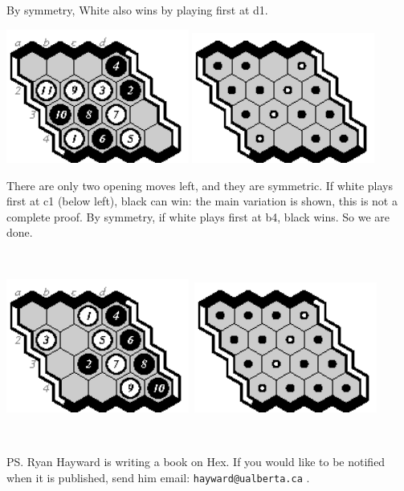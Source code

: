 \documentclass[12pt]{article}
\begin{document}
By symmetry, White also wins by playing first at d1.

\includegraphics[width=60mm]{fz/pix/4z.eps}
\includegraphics[width=60mm]{fz/pix/4x4.winners2.eps}
~

There are only two opening moves left, and they are symmetric.
If white plays first at c1 (below left), black can win:
the main variation is shown, this is not a complete proof.
By symmetry, if white plays first at b4, black wins.
So we are done.

~

\includegraphics[width=60mm]{fz/pix/4last.eps}\
\includegraphics[width=60mm]{fz/pix/4x4.winners.eps}

~

PS. Ryan Hayward is writing a book on Hex. If you would like
to be notified when it is published, send him email:
\verb+hayward@ualberta.ca+ .
\end{document}
